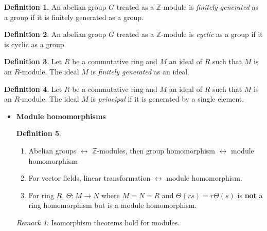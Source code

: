 \documentclass[11pt]{article}
\theoremstyle{definition}
\newtheorem{definition}{Definition}[section]
\theoremstyle{remark}
\newtheorem{remark}{Remark}[section]
\begin{document}
\begin{definition}\label{def:finitely_generated_abelian_group}
An abelian group $G$ treated as a $\mathbb{Z}$-module is \textit{finitely generated} as a group if it is finitely generated as a group.
\end{definition}

\begin{definition}\label{def:cyclic_abelian_group}
An abelian group $G$ treated as a $\mathbb{Z}$-module is \textit{cyclic} as a group if it is cyclic as a group.
\end{definition}

\begin{definition}\label{def:finitely_generated_ideal}
Let $R$ be a commutative ring and $M$ an ideal of $R$ such that $M$ is an $R$-module. The ideal $M$ is \textit{finitely generated} as an ideal.
\end{definition}

\begin{definition}\label{def:principal_ideal}
Let $R$ be a commutative ring and $M$ an ideal of $R$ such that $M$ is an $R$-module. The ideal $M$ is \textit{principal} if it is generated by a single element.
\end{definition}

\begin{itemize}
    \item \textbf{Module homomorphisms}

    \begin{definition}\label{def:module_homomorphism}
        \begin{enumerate}
            \item Abelian groups $\leftrightarrow$ $\mathbb{Z}$-modules, then group homomorphism $\leftrightarrow$ module homomorphism.
            \item For vector fields, linear transformation $\leftrightarrow$ module homomorphism.
            \item For ring $R$, $\Theta: M \to N$ where $M = N = R$ and $\Theta(rs) = r\Theta(s)$ is \textbf{not} a ring homomorphism but is a module homomorphism.
        \end{enumerate}
    \end{definition}

    \begin{remark}\label{rem:isomorphism_theorems}
        Isomorphism theorems hold for modules.
    \end{remark}
\end{itemize}

\end{document}
